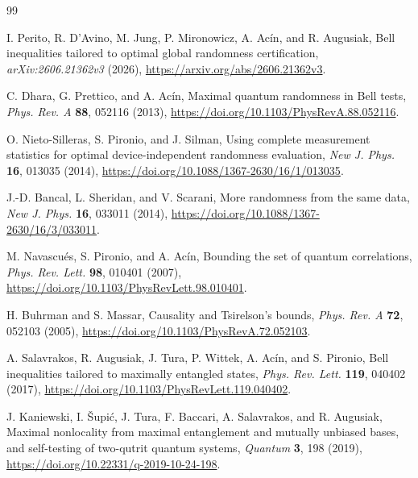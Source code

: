 \documentclass[11pt]{article}
\theoremstyle{definition}
\theoremstyle{remark}
\begin{document}
\begin{thebibliography}{99}
\raggedright

I. Perito, R. D'Avino, M. Jung, P. Mironowicz, A. Ac\'in, and R. Augusiak,
\newblock Bell inequalities tailored to optimal global randomness
certification,
\newblock \emph{arXiv:2606.21362v3} (2026),
\newblock \url{https://arxiv.org/abs/2606.21362v3}.

C. Dhara, G. Prettico, and A. Ac\'in,
\newblock Maximal quantum randomness in Bell tests,
\newblock \emph{Phys. Rev. A} \textbf{88}, 052116 (2013),
\newblock \url{https://doi.org/10.1103/PhysRevA.88.052116}.

O. Nieto-Silleras, S. Pironio, and J. Silman,
\newblock Using complete measurement statistics for optimal
device-independent randomness evaluation,
\newblock \emph{New J. Phys.} \textbf{16}, 013035 (2014),
\newblock \url{https://doi.org/10.1088/1367-2630/16/1/013035}.

J.-D. Bancal, L. Sheridan, and V. Scarani,
\newblock More randomness from the same data,
\newblock \emph{New J. Phys.} \textbf{16}, 033011 (2014),
\newblock \url{https://doi.org/10.1088/1367-2630/16/3/033011}.

M. Navascu\'es, S. Pironio, and A. Ac\'in,
\newblock Bounding the set of quantum correlations,
\newblock \emph{Phys. Rev. Lett.} \textbf{98}, 010401 (2007),
\newblock \url{https://doi.org/10.1103/PhysRevLett.98.010401}.

H. Buhrman and S. Massar,
\newblock Causality and Tsirelson's bounds,
\newblock \emph{Phys. Rev. A} \textbf{72}, 052103 (2005),
\newblock \url{https://doi.org/10.1103/PhysRevA.72.052103}.

A. Salavrakos, R. Augusiak, J. Tura, P. Wittek, A. Ac\'in, and S. Pironio,
\newblock Bell inequalities tailored to maximally entangled states,
\newblock \emph{Phys. Rev. Lett.} \textbf{119}, 040402 (2017),
\newblock \url{https://doi.org/10.1103/PhysRevLett.119.040402}.

J. Kaniewski, I. \v{S}upi\'c, J. Tura, F. Baccari, A. Salavrakos, and
R. Augusiak,
\newblock Maximal nonlocality from maximal entanglement and mutually unbiased
bases, and self-testing of two-qutrit quantum systems,
\newblock \emph{Quantum} \textbf{3}, 198 (2019),
\newblock \url{https://doi.org/10.22331/q-2019-10-24-198}.


\end{thebibliography}
\end{document}

